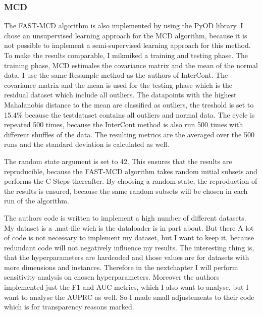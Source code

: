 \subsubsection*{MCD}
The FAST-MCD algorithm is also implemented by using the PyOD library. 
I chose an unsupervised learning approach for the MCD algorithm, because it is not possible to implement a semi-supervised learning approach for this method.
To make the results comparable, I mikmiked a training and testing phase.
The training phase, MCD estimales the covariance matrix and the mean of the normal data.
I use the same Resample method as the authors of InterCont. 
The covariance matrix and the mean is used for the testing phase which is the residual dataset which include all outliers.
The datapoints with the highest Mahalanobis distance to the mean are classified as outliers, the treshold is set to 15.4\% because the testdataset contains all outliers and normal data.
The cycle is repeated 500 times, because the InterCont method is also run 500 times with different shuffles of the data.
The resulting metrics are the averaged over the 500 runs and the standard deviation is calculated as well.

The random state argument is set to 42. 
This ensures that the results are reproducible, because the FAST-MCD algorithm takes random initial subsets and performs the C-Steps thereafter.
By choosing a random state, the reproduction of the results is ensured, because the same random subsets will be chosen in each run of the algorithm.


The authors code is written to implement a high number of different datasets.
My dataset is a .mat-file wich is the dataloader is in part about.
But there 
A lot of code is not necessary to implement my dataset, but I want to keep it, because redundant code will not negatively influence my results.
The interesting thing is, that the hyperparameters are hardcoded and those values are for datasets with more dimensions and instances.
Therefore in the nextchapter I will perform sensitivity analysis on chosen hyperparameters.
Moreover the authors implemented just the F1 and AUC metrics, which I also want to analyse, but I want to analyse the AUPRC as well.
So I made small adjustements to their code which is for transparency reasons marked.






